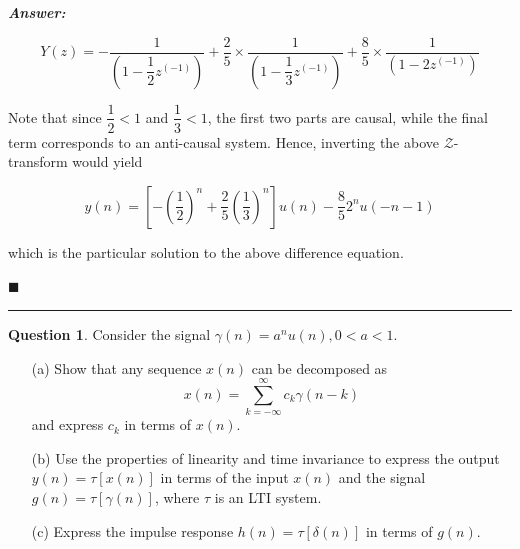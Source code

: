 \documentclass[12pt]{article}
\theoremstyle{definition}
\newtheorem{question}{Question}
\newenvironment{answer}{
    \textbf{\textit{Answer:}} \qquad
}{\hfill $\blacksquare$ \\ 

\begin{center}
    \rule{0.8\linewidth}{1.5px} 
    \vspace*{1cm}   
\end{center}
}
\newcommand{\zcal}{\mathcal{Z}}
\newcommand{\inv}[1][1]{^{(- #1)}}
\begin{document}
\begin{answer}
    $$
    Y(z) = -\dfrac{1}{\left( 1 - \dfrac{1}{2}z\inv\right)} + \dfrac{2}{5} \times \dfrac{1}{\left( 1 - \dfrac{1}{3}z\inv\right)} + \dfrac{8}{5} \times \dfrac{1}{\left( 1 - 2z\inv\right)}
    $$

    Note that since $\dfrac{1}{2} < 1$ and $\dfrac{1}{3} < 1$, the first two parts are causal, while the final term corresponds to an anti-causal system. Hence, inverting the above $\zcal$-transform would yield

    $$
    y(n) = \left[ -\left(\dfrac{1}{2}\right)^n + \dfrac{2}{5} \left(  \dfrac{1}{3}\right)^n \right] u(n) - \dfrac{8}{5} 2^n u(-n-1)
    $$
    
    which is the particular solution to the above difference equation.

\end{answer}

\begin{question}
    Consider the signal $\gamma(n) = a^n u(n), 0 < a < 1$.
    \begin{enumerate}
        \item[(a)] Show that any sequence $x(n)$ can be decomposed as
        $$
        x(n) = \sum_{k = -\infty}^{\infty} c_k \gamma(n-k)
        $$ 
        and express $c_k$ in terms of $x(n)$.
        \item[(b)] Use the properties of linearity and time invariance to express the output $y(n) = \tau[x(n)]$ in terms of the input $x(n)$ and the signal $g(n) = \tau[\gamma(n)]$, where $\tau$ is an LTI system.
        \item[(c)] Express the impulse response $h(n) = \tau[\delta(n)]$ in terms of $g(n)$.  
    \end{enumerate} 
\end{question}
\end{document}
